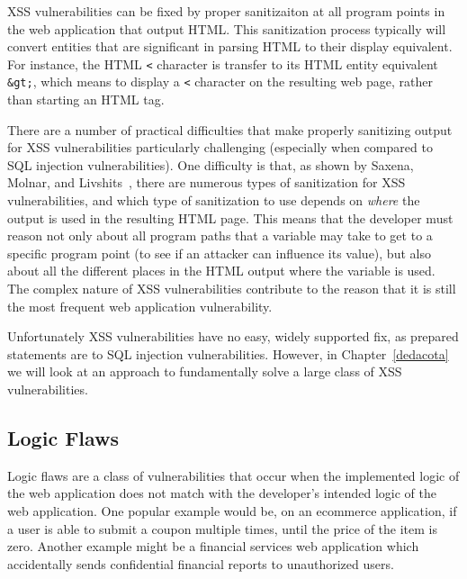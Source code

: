 XSS vulnerabilities can be fixed by proper sanitizaiton at all program
points in the web application that output HTML. This sanitization
process typically will convert entities that are significant in
parsing HTML to their display equivalent. For instance, the HTML
\texttt{<} character is transfer to its HTML entity equivalent
\texttt{\&gt;}, which means to display a \texttt{<} character on the
resulting web page, rather than starting an HTML tag.

There are a number of practical difficulties that make properly
sanitizing output for XSS vulnerabilities particularly challenging
(especially when compared to SQL injection vulnerabilities). One
difficulty is that, as shown by Saxena, Molnar, and
Livshits~\cite{saxena11:scriptgard}, there are numerous types of
sanitization for XSS vulnerabilities, and which type of sanitization
to use depends on \emph{where} the output is used in the resulting
HTML page. This means that the developer must reason not only about
all program paths that a variable may take to get to a specific
program point (to see if an attacker can influence its value), but
also about all the different places in the HTML output where the
variable is used. The complex nature of XSS vulnerabilities contribute
to the reason that it is still the most frequent web application
vulnerability.

Unfortunately XSS vulnerabilities have no easy, widely supported fix,
as prepared statements are to SQL injection vulnerabilities. However,
in Chapter~\ref{dedacota} we will look at an approach to fundamentally
solve a large class of XSS vulnerabilities.

\subsection{Logic Flaws}

Logic flaws are a class of vulnerabilities that occur when the
implemented logic of the web application does not match with the
developer's intended logic of the web application. One popular example
would be, on an ecommerce application, if a user is able to submit a
coupon multiple times, until the price of the item is zero. Another
example might be a financial services web application which
accidentally sends confidential financial reports to unauthorized
users. 

